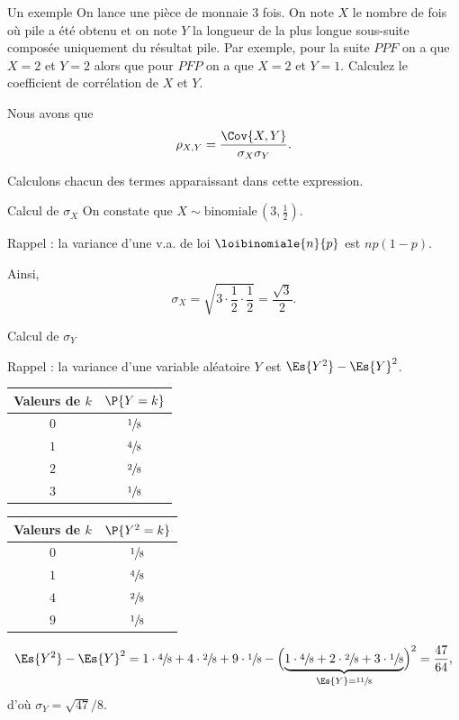 \documentclass[nuit,charter,pied]{BeamerJS}
\begin{document}
\begin{frame}{Un exemple}
	On lance une pièce de monnaie $3$ fois. On note $X$ le nombre de fois où pile a été obtenu et on note $Y$ la longueur de la plus longue sous-suite composée uniquement du résultat pile. Par exemple, pour la suite $PPF$ on a que $X=2$ et $Y=2$ alors que pour $PFP$ on a que $X=2$ et $Y=1$. Calculez le coefficient de corrélation de $X$ et $Y$.
	
	Nous avons que 
	\[\rho_{X,Y}=\frac{\Cov{X,Y}}{\sigma_X\sigma_Y}.\]
	
	Calculons chacun des termes apparaissant dans cette expression.
\end{frame}
\begin{frame}[t]{Calcul de $\sigma_X$}
On constate que $X\sim \text{binomiale}\,\left(3,\frac{1}{2}\right)$.
\begin{lumiere}
	Rappel : la variance d'une v.a. de loi $\loibinomiale{n}{p}$ est $np(1-p)$.
\end{lumiere}
Ainsi,
\[\sigma_X=\sqrt{3\cdot\frac{1}{2}\cdot\frac{1}{2}}=\frac{\sqrt{3}}{2}.\]
\end{frame}
\begin{frame}[t]{Calcul de $\sigma_Y$}
	\small
	\begin{lumiere}
		Rappel : la variance d'une variable aléatoire $Y$ est
		$\Es{Y^2}-\Es{Y}^2$.
	\end{lumiere}

\begin{center}
\begin{tabular}{@{}cc@{}}
	\toprule
	Valeurs de $k$ & $\P{Y=k}$ \\ \midrule
	$0$            & $\sfrac{1}{8}$              \\
	$1$            & $\sfrac{4}{8}$              \\
	$2$            & $\sfrac{2}{8}$              \\
	$3$            & $\sfrac{1}{8}$              \\ \bottomrule
\end{tabular}\hspace{2cm}
\begin{tabular}{@{}cc@{}}
	\toprule
	Valeurs de $k$ & $\P{Y^2=k}$     \\ \midrule
	$0$            & $\sfrac{1}{8}$ \\
	$1$            & $\sfrac{4}{8}$ \\
	$4$            & $\sfrac{2}{8}$ \\
	$9$            & $\sfrac{1}{8}$	\\ \bottomrule
\end{tabular}
\end{center}
\[\Es{Y^2}-\Es{Y}^2=1\cdot\sfrac{4}{8}+4\cdot\sfrac{2}{8}+9\cdot\sfrac{1}{8}-\Bigl(\underbrace{1\cdot\sfrac{4}{8}+2\cdot\sfrac{2}{8}+3\cdot\sfrac{1}{8}}_{\Es{Y}=\sfrac{11}{8}}\Bigr)^2=\frac{47}{64},\]
d'où $\sigma_{Y}=\sqrt{47}/8$.

\end{frame}
\end{document}
